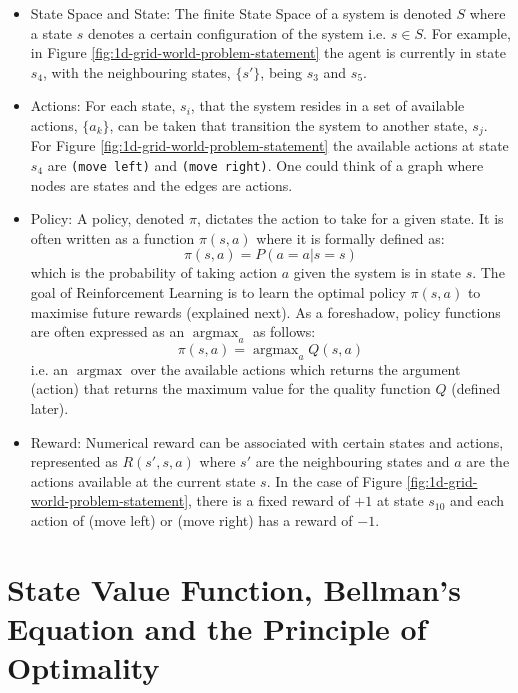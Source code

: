 \documentclass[a4paper,11pt]{article}
\DeclareMathOperator*{\argmax}{argmax}
\begin{document}
\begin{itemize}
    \item State Space and State: The finite State Space of a system is denoted $S$ where a state $s$ denotes a certain configuration of the system i.e. $s \in S$.  For example, in Figure \ref{fig:1d-grid-world-problem-statement} the agent is currently in state $s_4$, with the neighbouring states, $\{s'\}$, being $s_3$ and $s_5$.
    \item Actions: For each state, $s_i$, that the system resides in a set of available actions, $\{a_k\}$, can be taken that transition the system to another state, $s_j$.  For Figure \ref{fig:1d-grid-world-problem-statement} the available actions at state $s_4$ are \verb|(move left)| and \verb|(move right)|.  One could think of a graph where nodes are states and the edges are actions.
    \item Policy: A policy, denoted $\pi$, dictates the action to take for a given state.  It is often written as a function $\pi(s, a)$ where it is formally defined as:
    \begin{equation} \label{eqn:policy_formal_definition}
        \pi(s,a) = P(a=a|s=s)
    \end{equation}
    which is the probability of taking action $a$ given the system is in state $s$.  The goal of Reinforcement Learning is to learn the optimal policy $\pi(s,a)$ to maximise future rewards (explained next). As a foreshadow, policy functions are often expressed as an $\argmax_a$ as follows:
    \begin{equation} \label{eqn:value_iteration_foreshadow}
        \pi(s,a) = \argmax_a Q(s, a)
    \end{equation}
    i.e. an $\argmax$ over the available actions which returns the argument (action) that returns the maximum value for the quality function $Q$ (defined later).
    \item Reward: Numerical reward can be associated with certain states and actions, represented as $R(s',s,a)$ where $s'$ are the neighbouring states and $a$ are the actions available at the current state $s$.  In the case of Figure \ref{fig:1d-grid-world-problem-statement}, there is a fixed reward of $+1$ at state $s_{10}$ and each action of (move left) or (move right) has a reward of $-1$.
\end{itemize}

\section{State Value Function, Bellman's Equation and the Principle of Optimality}
\end{document}
